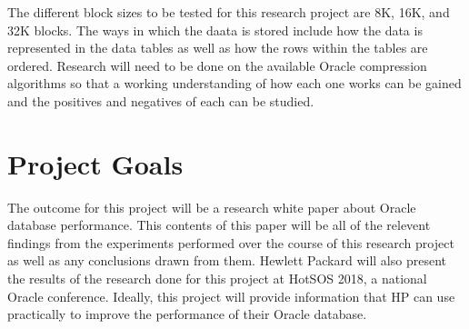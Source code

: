 \documentclass[10pt]{article}
\begin{document}
The different block sizes to be tested for this research project are 8K, 16K, and 32K blocks. 
The ways in which the daata is stored include how the data is represented in the data tables as well as how the rows within the tables are ordered. 
Research will need to be done on the available Oracle compression algorithms so that a working understanding of how each one works can be gained and the positives and negatives of each can be studied.

\section{Project Goals}
The outcome for this project will be a research white paper about Oracle database performance. 
This contents of this paper will be all of the relevent findings from the experiments performed over the course of this research project as well as any conclusions drawn from them.
Hewlett Packard will also present the results of the research done for this project at HotSOS 2018, a national Oracle conference. 
Ideally, this project will provide information that HP can use practically to improve the performance of their Oracle database.  
\end{document}
